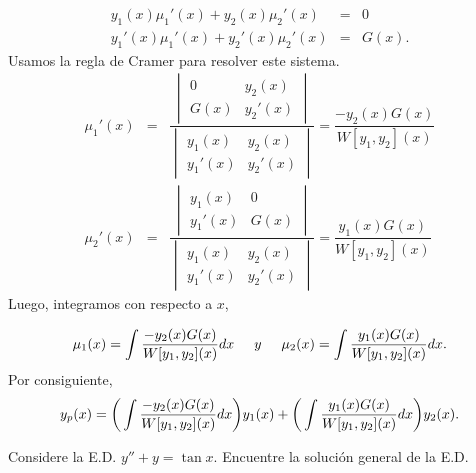 \documentclass{beamer}
\begin{document}
\begin{frame}[t]
	\begin{block}{}
		\[
			\begin{array}{rcl}
				y_1(x) \mu _1' (x) +y_2(x) \mu _2' (x) & = & 0 \\[2mm]
				y_1' (x) \mu _1' (x) + y_2'(x) \mu _2' (x) & = & G(x) .
			\end{array}
		\]
		Usamos la regla de Cramer para resolver este sistema.
		\[
			\begin{array}{rcl}
				\mu_1 '(x) & = & \dfrac{\begin{vmatrix}
					0 & y_2(x) \\
					G(x) & y_2'(x)
				\end{vmatrix}}{\begin{vmatrix}
					y_1(x) & y_2(x) \\
					y_1' (x) & y_2' (x)
				\end{vmatrix}} = \dfrac{-y_2(x) G(x)}{W[y_1,y_2] (x)} \\[1cm]
				\mu_2 '(x) & = & \dfrac{\begin{vmatrix}
					y_1(x) & 0 \\
					y_1'(x) & G(x)
				\end{vmatrix}}{\begin{vmatrix}
					y_1(x) & y_2(x) \\
					y_1' (x) & y_2' (x)
				\end{vmatrix}} = \dfrac{y_1(x) G(x)}{W[y_1,y_2] (x)}
			\end{array}
		\]
		Luego, integramos con respecto a \(x\),
	\end{block}
\end{frame}

\begin{frame}[t]
	\begin{block}{}
		\[
			\mu _1(x) = \displaystyle\int \dfrac{-y_2(x) G(x)}{W[y_1,y_2] (x)} dx \hspace{5mm} y \hspace{5mm} \mu _2(x) = \displaystyle\int \dfrac{y_1(x) G(x)}{W[y_1,y_2] (x)} dx.
		\]
		Por consiguiente,
		\[
			y_p(x) = \bigg(\displaystyle\int \dfrac{-y_2(x) G(x)}{W[y_1,y_2] (x)} dx\bigg) y_1(x) + \bigg(\displaystyle\int \dfrac{y_1(x) G(x)}{W[y_1,y_2] (x)} dx\bigg) y_2(x).
		\]
	\end{block}
	\begin{example}
		Considere la E.D. \(y'' +y = \tan x\). Encuentre la solución general de la E.D.
	\end{example}
\end{frame}
\begin{frame}[t]
\end{frame}
\end{document}
